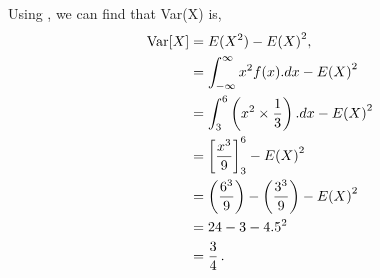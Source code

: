 \begin{subquestions}
\begin{subsubquestions}
\subsubquestion

Using , we can find that Var(X) is,
\begin{align}
	\text{Var}[X] & = E(X^2) - {E(X)}^2, \nonumber \\\
		   & = \int_{-\infty}^{\infty}x^2 f(x).dx - {E(X)}^2 \nonumber \\
		   & = \int_{3}^{6} \left( x^2 \times \frac{1}{3} \right).dx - {E(X)}^2 \nonumber \\
		   & = \left[\frac{x^3}{9} \right]^{6}_{3} - {E(X)}^2 \nonumber \\
		   & = \left( \frac{6^3}{9} \right) - \left( \frac{3^3}{9} \right) - {E(X)}^2 \nonumber \\
		   & = 24 -3 - 4.5^2 \nonumber \\
		   & = \frac{3}{4} \,.
\end{align}

\end{subsubquestions}

\end{subquestions}